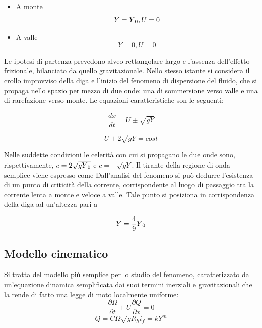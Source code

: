 \documentclass[12pt]{article} %
\begin{document}
\begin{itemize}
\item A monte 
\begin{equation}
 Y=Y\textsubscript{$0$}, U=0
\end{equation}
\item A valle
\begin{equation}
 Y=0, U=0
\end{equation}
\end{itemize}

\noindent Le ipotesi di partenza prevedono alveo rettangolare largo e l’assenza dell’effetto frizionale, bilanciato da quello gravitazionale.
Nello stesso istante si considera il crollo improvviso della diga e l’inizio del fenomeno di dispersione del fluido, che si propaga nello spazio per mezzo di due onde: una di sommersione verso valle e una di rarefazione verso monte.
Le equazioni caratteristiche son le seguenti:

\begin{equation}
\frac{dx}{dt}=U\pm \sqrt{gY}
\end{equation}

\begin{equation}
U \pm 2\sqrt{gY}=cost
\end{equation}

\noindent Nelle suddette condizioni le celerità con cui si propagano le due onde sono, rispettivamente, $c=2\sqrt{gY\textsubscript{$0$}}$ e $c=-\sqrt{gY}$.
Il tirante della regione di onda semplice viene espresso come
Dall’analisi del fenomeno si può dedurre l’esistenza di un punto di criticità della corrente, corrispondente al luogo di passaggio tra la corrente lenta a monte e veloce a valle. Tale punto si posiziona in corrispondenza della diga ad un’altezza pari a 

\begin{equation}
    Y=\frac{4}{9}Y\textsubscript{$0$}
\end{equation}
\subsection{Modello cinematico}
\noindent Si tratta del modello più semplice per lo studio del fenomeno, caratterizzato da un’equazione dinamica semplificata dai suoi termini inerziali e gravitazionali che la rende di fatto una legge di moto localmente uniforme:
\begin{equation}
\frac{\partial \Omega }{\partial t}+U\frac{\partial Q}{\partial x}=0
\end{equation}
\begin{equation}
Q=C\Omega\sqrt{gR_hi_f}=kY^m
\end{equation}
\end{document}

